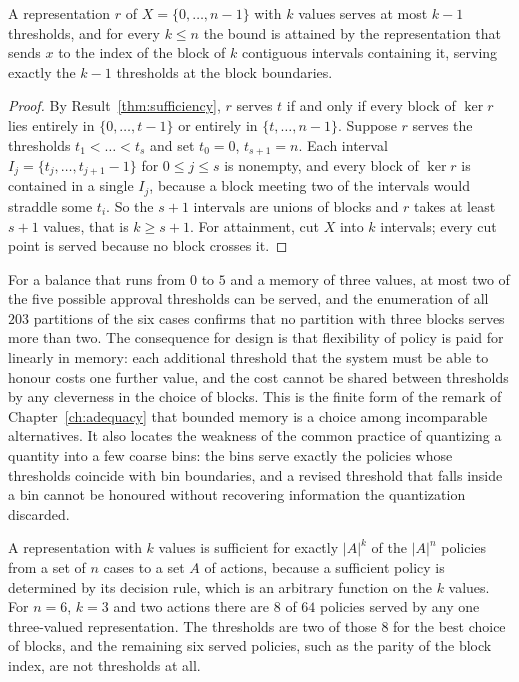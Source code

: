 \begin{newresult}\label{prop:thresholds-served}
A representation $r$ of $X=\{0,\dots,n-1\}$ with $k$ values serves at most $k-1$ thresholds, and for every $k\le n$ the bound is attained by the representation that sends $x$ to the index of the block of $k$ contiguous intervals containing it, serving exactly the $k-1$ thresholds at the block boundaries.
\end{newresult}
\begin{proof}
By Result~\ref{thm:sufficiency}, $r$ serves $t$ if and only if every block of $\ker r$ lies entirely in $\{0,\dots,t-1\}$ or entirely in $\{t,\dots,n-1\}$. Suppose $r$ serves the thresholds $t_1<\dots<t_s$ and set $t_0=0$, $t_{s+1}=n$. Each interval $I_j=\{t_j,\dots,t_{j+1}-1\}$ for $0\le j\le s$ is nonempty, and every block of $\ker r$ is contained in a single $I_j$, because a block meeting two of the intervals would straddle some $t_i$. So the $s+1$ intervals are unions of blocks and $r$ takes at least $s+1$ values, that is $k\ge s+1$. For attainment, cut $X$ into $k$ intervals; every cut point is served because no block crosses it.
\end{proof}

For a balance that runs from $0$ to $5$ and a memory of three values, at most two of the five possible approval thresholds can be served, and the enumeration of all $203$ partitions of the six cases confirms that no partition with three blocks serves more than two. The consequence for design is that flexibility of policy is paid for linearly in memory: each additional threshold that the system must be able to honour costs one further value, and the cost cannot be shared between thresholds by any cleverness in the choice of blocks. This is the finite form of the remark of Chapter~\ref{ch:adequacy} that bounded memory is a choice among incomparable alternatives. It also locates the weakness of the common practice of quantizing a quantity into a few coarse bins: the bins serve exactly the policies whose thresholds coincide with bin boundaries, and a revised threshold that falls inside a bin cannot be honoured without recovering information the quantization discarded.

\begin{example}\label{ex:policy-count}
A representation with $k$ values is sufficient for exactly $|A|^{k}$ of the $|A|^{n}$ policies from a set of $n$ cases to a set $A$ of actions, because a sufficient policy is determined by its decision rule, which is an arbitrary function on the $k$ values. For $n=6$, $k=3$ and two actions there are $8$ of $64$ policies served by any one three-valued representation. The thresholds are two of those $8$ for the best choice of blocks, and the remaining six served policies, such as the parity of the block index, are not thresholds at all.
\end{example}

